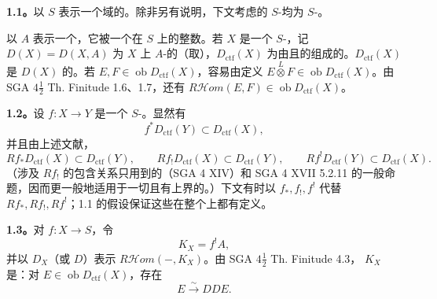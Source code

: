 \textbf{1.1。}以 $S$ 表示一个域的。除非另有说明，下文考虑的 $S$-均为 $S$-。

以 $A$ 表示一个，它被一个在 $S$ 上的整数。若 $X$ 是一个 $S$-，记 $D(X)=D(X,A)$ 为 $X$ 上 $A$-的（取），$D_{\mathrm{ctf}}(X)$ 为由且的组成的。$D_{\mathrm{ctf}}(X)$ 是 $D(X)$ 的。若 $E,F\in\operatorname{ob}D_{\mathrm{ctf}}(X)$，容易由定义 $E\mathbin{\overset L\otimes}F\in\operatorname{ob}D_{\mathrm{ctf}}(X)$。由 SGA $4\frac12$ Th. Finitude 1.6、1.7，还有 $R\mathcal Hom(E,F)\in\operatorname{ob}D_{\mathrm{ctf}}(X)$。

\textbf{1.2。}设 $f:X\to Y$ 是一个 $S$-。显然有
\[
f^*D_{\mathrm{ctf}}(Y)\subset D_{\mathrm{ctf}}(X),
\]
并且由上述文献，
\[
Rf_*D_{\mathrm{ctf}}(X)\subset D_{\mathrm{ctf}}(Y),\qquad
Rf_!D_{\mathrm{ctf}}(X)\subset D_{\mathrm{ctf}}(Y),\qquad
Rf^!D_{\mathrm{ctf}}(Y)\subset D_{\mathrm{ctf}}(X).
\]
（涉及 $Rf_!$ 的包含关系只用到的（SGA 4 XIV）和 SGA 4 XVII 5.2.11 的一般命题，因而更一般地适用于一切且有上界的。）下文有时以 $f_*,f_!,f^!$ 代替 $Rf_*,Rf_!,Rf^!$；1.1 的假设保证这些在整个上都有定义。

\textbf{1.3。}对 $f:X\to S$，令
\[
K_X=f^!A,
\]
并以 $D_X$（或 $D$）表示 $R\mathcal Hom(-,K_X)$。由 SGA $4\frac12$ Th. Finitude
4.3， $K_X$ 是：对 $E\in\operatorname{ob}D_{\mathrm{ctf}}(X)$，存在
\[
E\xrightarrow\sim DDE.
\]

